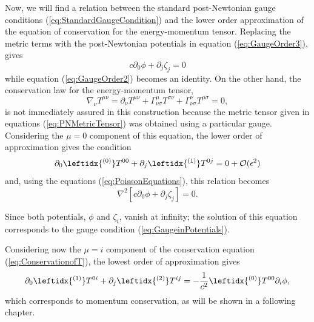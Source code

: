 Now, we will find a relation between the standard post-Newtonian gauge conditions (\ref{eq:StandardGaugeCondition}) and the lower order approximation of the equation of conservation for the energy-momentum tensor.  Replacing the metric terms with the post-Newtonian potentials in equation (\ref{eq:GaugeOrder3}), gives
\begin{equation}
 c \partial_0 \phi + \partial_j \zeta_j  = 0\label{eq:GaugeinPotentials}
 \end{equation} 
while equation (\ref{eq:GaugeOrder2}) becomes an identity. On the other hand, the conservation law for the energy-momentum tensor, 
\begin{equation}
\nabla_\nu T^{\mu \nu} = \partial_\nu T^{\mu \nu} + \Gamma^\mu _{\nu \sigma} T^{\sigma \nu} + \Gamma^\nu _{\nu \sigma} T^{\mu \sigma } = 0, \label{eq:ConservationofT}
\end{equation}
is not immediately assured in this construction because the metric tensor given in equations (\ref{eq:PNMetricTensor}) was obtained using a particular gauge. Considering the $\mu=0$ component of this equation, the lower order of approximation gives the condition 
\begin{equation}
\partial_0 \leftidx{^{(0)}} T^{00} + \partial_j \leftidx{^{(1)}} T^{0j} = 0 +\mathcal{O}(\epsilon^2)
\end{equation}
and, using the equations (\ref{eq:PoissonEquations}), this relation becomes
\begin{equation}
\nabla^2 \left[  c \partial_0 \phi + \partial_j \zeta_j  \right] = 0.
\end{equation}

Since both potentials, $\phi$ and $\zeta_i$, vanish at infinity; the solution of this equation corresponds to the gauge condition (\ref{eq:GaugeinPotentials}).

Considering now the $\mu=i$ component of the conservation equation (\ref{eq:ConservationofT}), the lowest order of approximation gives
\begin{equation}
\partial_0 \leftidx{^{(1)}} T^{0i} + \partial_j \leftidx{^{(2)}} T^{ij} = -\frac{1}{c^2}  \leftidx{^{(0)}} T^{00} \partial_i \phi , 
\end{equation}
which corresponds to momentum conservation, as will be shown in a following chapter.